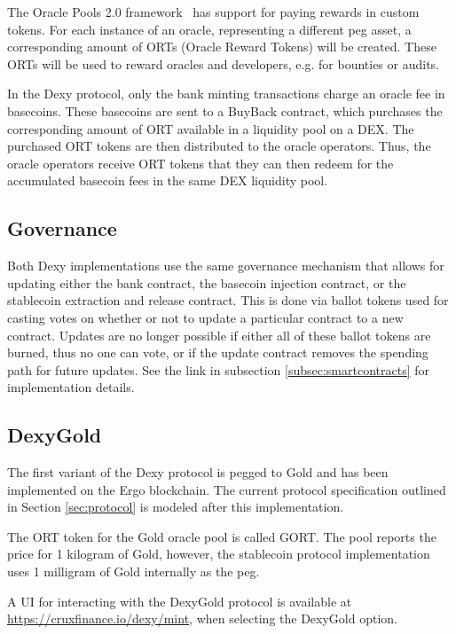 \documentclass{ifcolog}
\newcommand{\dxg}{DexyGold}
\begin{document}
The Oracle Pools 2.0 framework~\cite{eip23} has support for paying rewards in custom tokens. For each instance of an oracle, 
representing a different peg asset, a corresponding amount of ORTs (Oracle Reward Tokens) will be created. 
These ORTs will be used to reward oracles and developers, e.g. for bounties or audits.

In the Dexy protocol, only the bank minting transactions charge an oracle fee in basecoins. 
These basecoins are sent to a BuyBack contract, which purchases the corresponding amount of ORT available in a liquidity pool on a DEX. 
The purchased ORT tokens are then distributed to the oracle operators. Thus, the oracle operators receive ORT tokens that they 
can then redeem for the accumulated basecoin fees in the same DEX liquidity pool.

\subsection{Governance}
\label{subsec:governance}

Both Dexy implementations use the same governance mechanism that allows for updating either the bank contract, 
the basecoin injection contract, or the stablecoin extraction and release contract. This is done via ballot tokens used 
for casting votes on whether or not to update a particular contract to a new contract. Updates are no longer possible if either all 
of these ballot tokens are burned, thus no one can vote, or if the update contract removes the spending path for future updates.
See the link in subsection \ref{subsec:smartcontracts} for implementation details.

\subsection{\dxg}
\label{subsec:dexygold}

The first variant of the Dexy protocol is pegged to Gold and has been implemented on the Ergo blockchain. The current protocol 
specification outlined in Section \ref{sec:protocol} is modeled after this implementation.

The ORT token for the Gold oracle pool is called GORT. The pool reports the price for 1 kilogram of Gold, however, 
the stablecoin protocol implementation uses 1 milligram of Gold internally as the peg.

A UI for interacting with the \dxg{} protocol is available at \url{https://cruxfinance.io/dexy/mint}, 
when selecting the DexyGold option.
\end{document}
